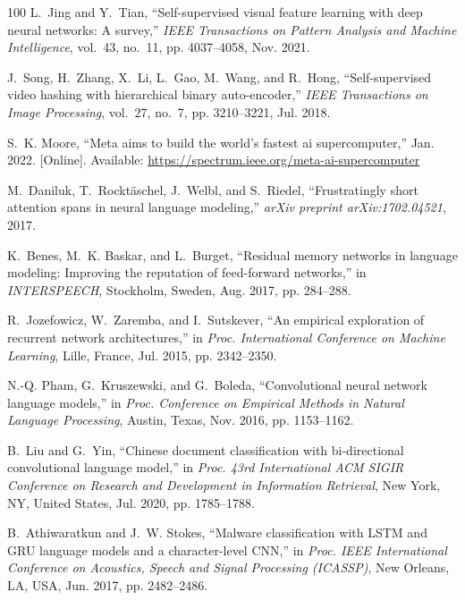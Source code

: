 \documentclass[journal]{IEEEtran}
\begin{document}
\begin{thebibliography}{100}
	L.~Jing and Y.~Tian, ``Self-supervised visual feature learning with deep neural
	networks: A survey,'' \emph{IEEE Transactions on Pattern Analysis and Machine
		Intelligence}, vol.~43, no.~11, pp. 4037--4058, Nov. 2021.
	
	J.~Song, H.~Zhang, X.~Li, L.~Gao, M.~Wang, and R.~Hong, ``Self-supervised video
	hashing with hierarchical binary auto-encoder,'' \emph{IEEE Transactions on
		Image Processing}, vol.~27, no.~7, pp. 3210--3221, Jul. 2018.
	
	\BIBentryALTinterwordspacing
	S.~K. Moore, ``Meta aims to build the world’s fastest ai supercomputer,''
	Jan. 2022. [Online]. Available:
	\url{https://spectrum.ieee.org/meta-ai-supercomputer}
	\BIBentrySTDinterwordspacing
	
	M.~Daniluk, T.~Rockt{\"a}schel, J.~Welbl, and S.~Riedel, ``Frustratingly short
	attention spans in neural language modeling,'' \emph{arXiv preprint
		arXiv:1702.04521}, 2017.
	
	K.~Benes, M.~K. Baskar, and L.~Burget, ``Residual memory networks in language
	modeling: Improving the reputation of feed-forward networks,'' in
	\emph{INTERSPEECH}, Stockholm, Sweden, Aug. 2017, pp. 284--288.
	
	R.~Jozefowicz, W.~Zaremba, and I.~Sutskever, ``An empirical exploration of
	recurrent network architectures,'' in \emph{Proc. International Conference on
		Machine Learning}, Lille, France, Jul. 2015, pp. 2342--2350.
	
	N.-Q. Pham, G.~Kruszewski, and G.~Boleda, ``Convolutional neural network
	language models,'' in \emph{Proc. Conference on Empirical Methods in Natural
		Language Processing}, Austin, Texas, Nov. 2016, pp. 1153--1162.
	
	B.~Liu and G.~Yin, ``Chinese document classification with bi-directional
	convolutional language model,'' in \emph{Proc. 43rd International ACM SIGIR
		Conference on Research and Development in Information Retrieval}, New York,
	NY, United States, Jul. 2020, pp. 1785--1788.
	
	B.~Athiwaratkun and J.~W. Stokes, ``Malware classification with {LSTM} and
	{GRU} language models and a character-level {CNN},'' in \emph{Proc. IEEE
		International Conference on Acoustics, Speech and Signal Processing
		(ICASSP)}, New Orleans, LA, USA, Jun. 2017, pp. 2482--2486.
	

\end{thebibliography}
\end{document}
